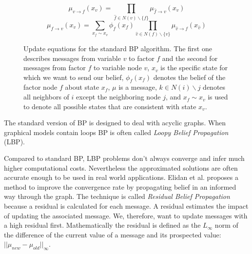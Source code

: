 \begin{figure}
\label{eqn:bp_message}
\begin{equation*}                                                            
\mu_{v\rightarrow f}(x_v) = \prod_{\hat f \in N(v)\backslash \{f\}} \mu_{\hat f\rightarrow v}(x_v)
\end{equation*}
\begin{equation*}                                                            
\mu_{f\rightarrow v}(x_v) = \sum_{x_f \sim x_v}\phi_f(x_f) \prod_{\hat v \in N(f)\backslash \{v\}} \mu_{\hat v\rightarrow f}(x_{\hat v})
\end{equation*}
\caption{Update equations for the standard BP algorithm. The first one describes messages from variable $v$ to factor $f$ and the second for messages from factor $f$ to variable node $v$, $x_v$ is the specific state for which we want to send our belief, $\phi_f(x_f)$ denotes the belief of the factor node $f$ about state $x_f$, $\mu$ is a message, $k \in N(i)\backslash j$ denotes all neighbors of $i$ except the neighboring node $j$, and $x_f \sim x_v$ is used to denote all possible states that are consistent with state $x_v$.}
\end{figure}

The standard version of BP is designed to deal with acyclic graphs. When graphical models contain loops BP is often called \textit{Loopy Belief Propagation} (LBP).

Compared to standard BP, LBP problems don't always converge and infer much higher computational costs. Nevertheless the approximated solutions are often accurate enough to be used in real world applications. Elidan et al. \cite{elidan2012residual} proposes a method to improve the convergence rate by propagating belief in an informed way through the graph. The technique is called \textit{Residual Belief Propagation} because a residual is calculated for each message. A residual estimates the impact of updating the associated message. We, therefore, want to update messages with a high residual first. Mathematically the residual is defined as the $L_\infty$ norm of the difference of the current value of a message and its prospected value: $||\mu_{new} - \mu_{old}||_\infty$.


